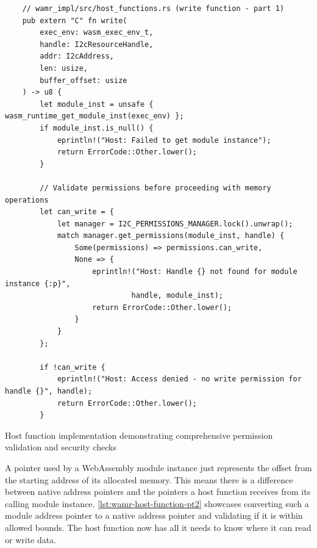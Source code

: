 \begin{listing}[H]
    \begin{verbatim}
    // wamr_impl/src/host_functions.rs (write function - part 1)
    pub extern "C" fn write(
        exec_env: wasm_exec_env_t,
        handle: I2cResourceHandle,
        addr: I2cAddress,
        len: usize,
        buffer_offset: usize
    ) -> u8 {
        let module_inst = unsafe { wasm_runtime_get_module_inst(exec_env) };
        if module_inst.is_null() {
            eprintln!("Host: Failed to get module instance");
            return ErrorCode::Other.lower();
        }
    
        // Validate permissions before proceeding with memory operations
        let can_write = {
            let manager = I2C_PERMISSIONS_MANAGER.lock().unwrap();
            match manager.get_permissions(module_inst, handle) {
                Some(permissions) => permissions.can_write,
                None => {
                    eprintln!("Host: Handle {} not found for module instance {:p}", 
                             handle, module_inst);
                    return ErrorCode::Other.lower();
                }
            }
        };
    
        if !can_write {
            eprintln!("Host: Access denied - no write permission for handle {}", handle);
            return ErrorCode::Other.lower();
        }
    \end{verbatim}
    \caption{Host function implementation demonstrating comprehensive permission validation and security checks}
    \label{lst:wamr-host-function-pt1}
\end{listing}

A pointer used by a WebAssembly module instance just represents the offset from the starting address of its allocated memory. This means there is a difference between native address pointers and the pointers a host function receives from its calling module instance. \autoref{lst:wamr-host-function-pt2} showcases converting such a module address pointer to a native address pointer and validating if it is within allowed bounds. The host function now has all it needs to know where it can read or write data.

